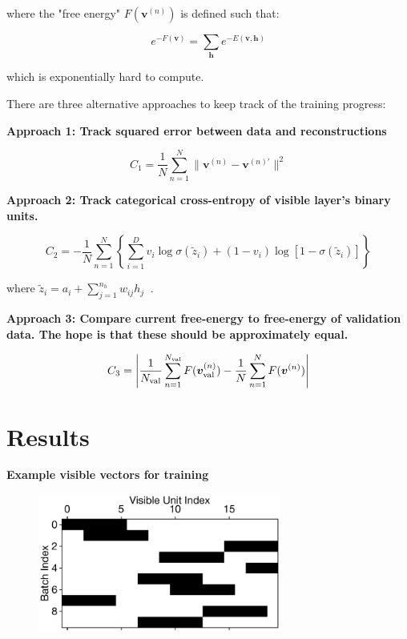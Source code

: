 \documentclass[12pt, two sided]{article}
\begin{document}
where the "free energy" $F(\mathbf{v}^{(n)})$ is defined such that:

\begin{equation}
e^{-F(\mathbf{v})} = \sum_{\mathbf{h}} e^{-E(\mathbf{v,h})}
\end{equation}

which is exponentially hard to compute.

There are three alternative approaches to keep track of the training progress:

\textbf{Approach 1: Track squared error between data and reconstructions}

\begin{equation}
C_1 = \frac{1}{N} \sum_{n=1}^{N} \| \boldsymbol{v}^{(n)} - \boldsymbol{v}^{(n)\prime} \|^2
\end{equation}

\textbf{Approach 2: Track categorical cross-entropy of visible layer's binary units.}

\begin{equation}
C_2 = - \frac{1}{N} \sum_{n=1}^{N} \left\{ \sum_{i=1}^{D} v_i  \log \sigma(\tilde{z}_i) + (1-v_i) \log \left[1-\sigma(\tilde{z}_i) \right] \right \}
\end{equation}

where $ \tilde{z}_i = a_i + \sum_{j=1}^{n_h} w_{ij} h_j\ $ .

\textbf{Approach 3: Compare current free-energy to free-energy of validation data. The hope is that these should be approximately equal.}

\begin{equation}
C_3 = \left\lvert \frac{1}{N_{\rm val}}  \sum_{n=1}^{N_{\rm val}} F(\boldsymbol{v}_{\rm val}^{(n)}) - \frac{1}{N} \sum_{n=1}^{N} F(\boldsymbol{v}^{(n)}) \right \rvert
\end{equation}


\section{Results}

\textbf{Example visible vectors for training}
\begin{figure}[h!]
\includegraphics[width=8cm]{Figures/training_visible_vectors.pdf}
\end{figure} 
\end{document}
